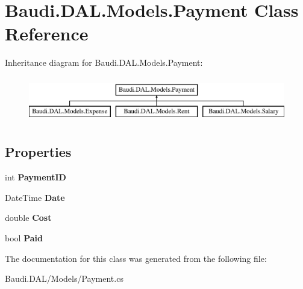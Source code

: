 \hypertarget{class_baudi_1_1_d_a_l_1_1_models_1_1_payment}{}\section{Baudi.\+D\+A\+L.\+Models.\+Payment Class Reference}
\label{class_baudi_1_1_d_a_l_1_1_models_1_1_payment}
Inheritance diagram for Baudi.\+D\+A\+L.\+Models.\+Payment\+:\begin{figure}[H]
\begin{center}
\leavevmode
\includegraphics[height=2.000000cm]{class_baudi_1_1_d_a_l_1_1_models_1_1_payment}
\end{center}
\end{figure}
\subsection*{Properties}
\begin{DoxyCompactItemize}
\item 
\hypertarget{class_baudi_1_1_d_a_l_1_1_models_1_1_payment_a6b15e99bfd13b58439ddf062c4493ed4}{}int {\bfseries Payment\+I\+D}\label{class_baudi_1_1_d_a_l_1_1_models_1_1_payment_a6b15e99bfd13b58439ddf062c4493ed4}

\item 
\hypertarget{class_baudi_1_1_d_a_l_1_1_models_1_1_payment_aecedd71f145e500ff726ff501d66f738}{}Date\+Time {\bfseries Date}\label{class_baudi_1_1_d_a_l_1_1_models_1_1_payment_aecedd71f145e500ff726ff501d66f738}

\item 
\hypertarget{class_baudi_1_1_d_a_l_1_1_models_1_1_payment_acd30fd3ab6c60ffb000d9fc2d59a6151}{}double {\bfseries Cost}\label{class_baudi_1_1_d_a_l_1_1_models_1_1_payment_acd30fd3ab6c60ffb000d9fc2d59a6151}

\item 
\hypertarget{class_baudi_1_1_d_a_l_1_1_models_1_1_payment_aa24e4532c6ab54c268405fea484d3c0d}{}bool {\bfseries Paid}\label{class_baudi_1_1_d_a_l_1_1_models_1_1_payment_aa24e4532c6ab54c268405fea484d3c0d}

\end{DoxyCompactItemize}


The documentation for this class was generated from the following file\+:\begin{DoxyCompactItemize}
\item 
Baudi.\+D\+A\+L/\+Models/Payment.\+cs\end{DoxyCompactItemize}
